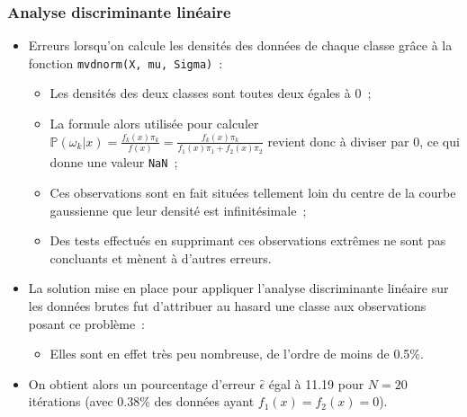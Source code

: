 \documentclass[a4paper,10pt]{report}
\begin{document}
\subsubsection{Analyse discriminante linéaire}
\begin{itemize}
	\item Erreurs lorsqu'on calcule les densités des données de chaque classe grâce à la fonction \texttt{mvdnorm(X, mu, Sigma)}~:
	\begin{itemize}
		\item Les densités des deux classes sont toutes deux égales à 0~;
		\item La formule alors utilisée pour calculer $\mathbb{P}(\omega_k|x) = \frac{f_k(x)\pi_k}{f(x)} = \frac{f_k(x)\pi_k}{f_1(x)\pi_1 + f_2(x)\pi_2}$ revient donc à diviser par 0, ce qui donne une valeur \texttt{NaN}~;
		\item Ces observations sont en fait situées tellement loin du centre de la courbe gaussienne que leur densité est infinitésimale~;
		\item Des tests effectués en supprimant ces observations extrêmes ne sont pas concluants et mènent à d'autres erreurs.
	\end{itemize}
	\item La solution mise en place pour appliquer l'analyse discriminante linéaire sur les données brutes fut d'attribuer au hasard une classe aux observations posant ce problème~:
	\begin{itemize}
		\item Elles sont en effet très peu nombreuse, de l'ordre de moins de 0.5\%.
	\end{itemize}
	\item On obtient alors un pourcentage d'erreur $\hat{\epsilon}$ égal à 11.19 pour $N = 20$ itérations (avec 0.38\% des données ayant $f_1(x) = f_2(x) = 0$).
\end{itemize}
\end{document}

